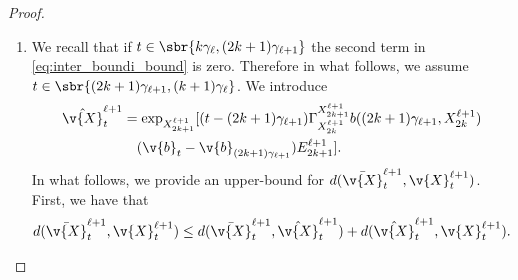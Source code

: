 \begin{proof}{}{}
\begin{enumerate}[wide, labelindent=0pt, label=(\alph*)]
		      Combining these results and \eqref{eq:upper_bound_distance_cheng_duo} we get that \begin{align}  & d(\bar{\v{X}}_{t}^{\ell+1}, \v{X}_{t}^\ell)^2 \leq (1 +C \kappa_k^2 \exp[4 \kappa_k]) d(X_k^\ell,X_{2k}^{\ell+1})^2 \\ & \qquad \qquad \qquad + C \exp[4 \kappa_k] \mathtt{m}{L}_1^2 \gamma_\ell^2 d(X_k^\ell, X_{2k}^{\ell+1})^2 \\ & \qquad \qquad \qquad + 2 \mathtt{m}{L}_1 \gamma_\ell d(X_k^\ell, X_{2k}^{\ell+1})d(X_k^\ell, X_{2k}^{\ell+1}) \\ & \qquad \qquad \leq (1 +C \kappa_k^2 \exp[4 \kappa_k] + 2C \exp[4 \kappa_k] \mathtt{m}{L}_1^2 \gamma_\ell^2) d(X_k^\ell,X_{2k}^{\ell+1})^2 \\ & \qquad \qquad \qquad + 2 \mathtt{m}{L}_1 \gamma_\ell d(X_k^\ell, X_{2k}^{\ell+1})^2 + 2 \mathtt{m}{L}_2^2 \gamma_\ell^4 \\ & \qquad \qquad \leq (1 +C \kappa_k^2 \exp[4 \kappa_k] + 2C \exp[4 \kappa_k] \mathtt{m}{L}_1^2 \gamma_\ell^2 + 2 \mathtt{m}{L}_1 \gamma_\ell) d(X_k^\ell,X_{2k}^{\ell+1})^2 .
		      \end{align}
		      Hence, there exists $C_1 \geq 0$ (not dependent on $k$ or $\ell$) such that for any $t \in \sbr{k \gamma_\ell, (k+1) \gamma_\ell}$ \begin{equation}\label{eq:case_complete} (1 + 2^{-\ell}) d(\bar{\v{X}}_{t}^{\ell+1}, \v{X}_{t}^\ell)^2 \leq (1 +C_1\{ \kappa_k^2 \exp[4 \kappa_k] + \gamma_\ell^2 \exp[4\kappa_k] + 2^{-\ell}\}) d(X_k^\ell,X_{2k}^{\ell+1})^2 + C_1 \gamma_\ell^3 .
		      \end{equation}
		\item We recall that if $t \in \sbr{k \gamma_{\ell}, (2k+1) \gamma_{\ell+1}}$
		      the second term in \eqref{eq:inter_boundi_bound} is zero.
		      Therefore in what follows, we assume $t \in \sbr{(2k+1) \gamma_{\ell+1}, (k+1) \gamma_\ell}$.
		      We introduce \begin{align} \hat{\v{X}}_{t}^{\ell+1} & = \exp_{X_{2k+1}^{\ell+1}}[(t - (2k+1)\gamma_{\ell+1}) \Gamma_{X_{2k}^{\ell+1}}^{X_{2k+1}^{\ell+1}} b((2k+1)\gamma_{\ell+1}, X_{2k}^{\ell+1}) \\  & \quad (\v{b}_{t} - \v{b}_{(2k+1) \gamma_{\ell+1}}) E_{2k+1}^{\ell+1}] .
                 \label{eq:hat_X_redef}
		      \end{align}
		      In what follows, we provide an upper-bound for $d(\bar{\v{X}}_{t}^{\ell+1}, \v{X}_{t}^{\ell+1})$.
		      First, we have that \begin{equation} d(\bar{\v{X}}_{t}^{\ell+1}, \v{X}_{t}^{\ell+1}) \leq d(\bar{\v{X}}_{t}^{\ell+1}, \hat{\v{X}}_{t}^{\ell+1}) + d(\hat{\v{X}}_{t}^{\ell+1}, \v{X}_{t}^{\ell+1}) .

\end{equation}
\end{enumerate}
\end{proof}
